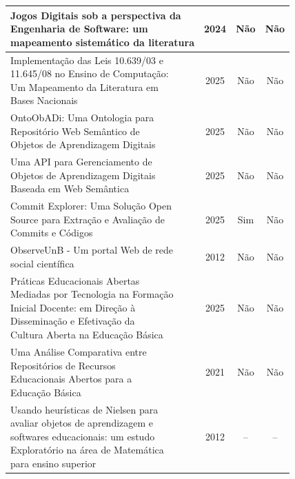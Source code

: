 \documentclass{article}
\begin{document}
\begin{table}[htbp]
\begin{tabular}{p{7cm} c c c}
			\midrule
			\makecell[l]{Jogos Digitais sob a perspectiva da \\ Engenharia de Software: um \\ mapeamento sistemático da literatura} & 2024 & Não & Não \\
			\midrule
			\makecell[l]{Implementação das Leis 10.639/03 e \\ 11.645/08 no Ensino de Computação: \\ Um Mapeamento da Literatura em \\ Bases Nacionais} & 2025 & Não & Não \\
			\midrule
			\makecell[l]{OntoObADi: Uma Ontologia para \\ Repositório Web Semântico de \\ Objetos de Aprendizagem Digitais} & 2025 & Não & Não \\
			\midrule
			\makecell[l]{Uma API para Gerenciamento de \\ Objetos de Aprendizagem Digitais \\ Baseada em Web Semântica} & 2025 & Não & Não \\
			\midrule
			\makecell[l]{Commit Explorer: Uma Solução Open \\ Source para Extração e Avaliação de \\ Commits e Códigos} & 2025 & Sim & Não \\
			\midrule
			\makecell[l]{ObserveUnB - Um portal Web de rede \\ social científica} & 2012 & Não & Não \\
			\midrule
			\makecell[l]{Práticas Educacionais Abertas \\ Mediadas por Tecnologia na Formação \\ Inicial Docente: em Direção à \\ Disseminação e Efetivação da \\ Cultura Aberta na Educação Básica} & 2025 & Não & Não \\
			\midrule
			\makecell[l]{Uma Análise Comparativa entre \\ Repositórios de Recursos \\ Educacionais Abertos para a \\ Educação Básica} & 2021 & Não & Não \\
			\midrule
			\makecell[l]{Usando heurísticas de Nielsen para \\ avaliar objetos de aprendizagem e \\ softwares educacionais: um estudo \\ Exploratório na área de Matemática \\ para ensino superior} & 2012 & -- & -- \\
			\bottomrule
		\end{tabular}
	\end{table}
	
\end{document}
